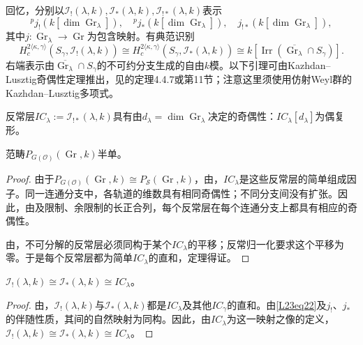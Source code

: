 回忆，分别以$\mathcal I_!(\lambda,k),\mathcal I_*(\lambda,k),\mathcal I_{!*}(\lambda,k)$表示
\[{}^pj_!(k[\dim\operatorname{Gr}_\lambda]),\quad{}^pj_*(k[\dim\operatorname{Gr}_\lambda]),\quad j_{!*}(k[\dim\operatorname{Gr}_\lambda]),\]
其中$j:\operatorname{Gr}_\lambda\to\operatorname{Gr}$为包含映射。有典范识别
\begin{equation}\tag{2.2}\label{L23eq22}
H_c^{2\langle\kappa,\gamma\rangle}(S_\gamma,\mathcal I_!(\lambda,k))\cong H_c^{2\langle\kappa,\gamma\rangle}(S_\gamma,\mathcal I_*(\lambda,k))\cong k[\operatorname{Irr}(\overline{\operatorname{Gr}_\lambda}\cap S_\gamma)].
\end{equation}
右端表示由$\overline{\operatorname{Gr}_\lambda}\cap S_\gamma$的不可约分支生成的自由$k$模。以下引理可由Kazhdan–Lusztig奇偶性定理推出，见的定理4.4.7或第11节；注意这里须使用仿射Weyl群的Kazhdan–Lusztig多项式。
\begin{lemma}\label{L23S2O2}
反常层$IC_\lambda:=\mathcal I_{!*}(\lambda,k)$具有由$d_\lambda=\dim\operatorname{Gr}_\lambda$决定的奇偶性：$IC_\lambda[d_\lambda]$为偶复形。
\end{lemma}
\begin{theorem}\label{L23S2O3}范畴$P_{G(\mathcal O)}(\operatorname{Gr},k)$半单。\end{theorem}
\begin{proof}
由于$P_{G(\mathcal O)}(\operatorname{Gr},k)\cong P_{\mathcal S}(\operatorname{Gr},k)$，由，$IC_\lambda$是这些反常层的简单组成因子。同一连通分支中，各轨道的维数具有相同奇偶性；不同分支间没有扩张。因此，由及限制、余限制的长正合列，每个反常层在每个连通分支上都具有相应的奇偶性。

由，不可分解的反常层必须同构于某个$IC_\lambda$的平移；反常归一化要求这个平移为零。于是每个反常层都为简单$IC_\lambda$的直和，定理得证。
\end{proof}
\begin{corollary}\label{L23S2O4}$\mathcal I_!(\lambda,k)\cong\mathcal I_*(\lambda,k)\cong IC_\lambda$。\end{corollary}
\begin{proof}
由，$\mathcal I_!(\lambda,k)$与$\mathcal I_*(\lambda,k)$都是$IC_\lambda$及其他$IC_\gamma$的直和。由\eqref{L23eq22}及$j_!$、$j_*$的伴随性质，其间的自然映射为同构。因此，由$IC_\lambda$为这一映射之像的定义，$\mathcal I_!(\lambda,k)\cong\mathcal I_*(\lambda,k)\cong IC_\lambda$。
\end{proof}
